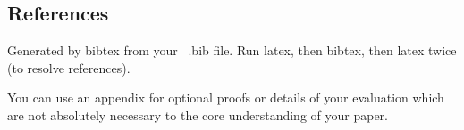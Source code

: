 \documentclass{vldb}
\begin{document}


\subsection{References}
Generated by bibtex from your ~.bib file.  Run latex,
then bibtex, then latex twice (to resolve references).


\begin{appendix}
You can use an appendix for optional proofs or details of your evaluation which are not absolutely necessary to the core understanding of your paper. 


\end{appendix}
\end{document}
